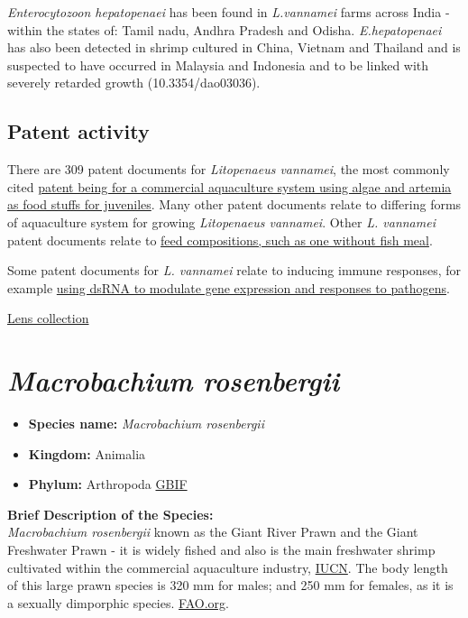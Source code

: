 \documentclass[]{book}
\providecommand{\tightlist}{%
  \setlength{\itemsep}{0pt}\setlength{\parskip}{0pt}}
\theoremstyle{definition}
\theoremstyle{definition}
\theoremstyle{definition}
\theoremstyle{remark}
\begin{document}
\emph{Enterocytozoon hepatopenaei} has been found in \emph{L.vannamei}
farms across India - within the states of: Tamil nadu, Andhra Pradesh
and Odisha. \emph{E.hepatopenaei} has also been detected in shrimp
cultured in China, Vietnam and Thailand and is suspected to have
occurred in Malaysia and Indonesia and to be linked with severely
retarded growth (10.3354/dao03036).

\hypertarget{patent-activity-2}{%
\subsection{Patent activity}\label{patent-activity-2}}

There are 309 patent documents for \emph{Litopenaeus vannamei}, the most
commonly cited
\href{https://www.lens.org/lens/patent/US_6615767_B1}{patent being for a
commercial aquaculture system using algae and artemia as food stuffs for
juveniles}. Many other patent documents relate to differing forms of
aquaculture system for growing \emph{Litopenaeus vannamei}. Other
\emph{L. vannamei} patent documents relate to
\href{https://www.lens.org/lens/patent/CN_102648738_A}{feed
compositions, such as one without fish meal}.

Some patent documents for \emph{L. vannamei} relate to inducing immune
responses, for example
\href{https://www.lens.org/lens/patent/US_2005_0080032_A1}{using dsRNA
to modulate gene expression and responses to pathogens}.

\href{https://www.lens.org/lens/collection/24984}{Lens collection}

\hypertarget{macrobachium-rosenbergii}{%
\section{\texorpdfstring{\emph{Macrobachium
rosenbergii}}{Macrobachium rosenbergii}}\label{macrobachium-rosenbergii}}

\begin{itemize}
\tightlist
\item
  \textbf{Species name:} \emph{Macrobachium rosenbergii}\\
\item
  \textbf{Kingdom:} Animalia\\
\item
  \textbf{Phylum:} Arthropoda
  \href{https://www.gbif.org/species/2224546}{GBIF}
\end{itemize}

\textbf{Brief Description of the Species:}\\
\emph{Macrobachium rosenbergii} known as the Giant River Prawn and the
Giant Freshwater Prawn - it is widely fished and also is the main
freshwater shrimp cultivated within the commercial aquaculture industry,
\href{http://www.iucnredlist.org/details/197873/0}{IUCN}. The body
length of this large prawn species is 320 mm for males; and 250 mm for
females, as it is a sexually dimporphic species.
\href{http://www.fao.org/fishery/culturedspecies/Macrobrachium_rosenbergii/en}{FAO.org}.
\end{document}
